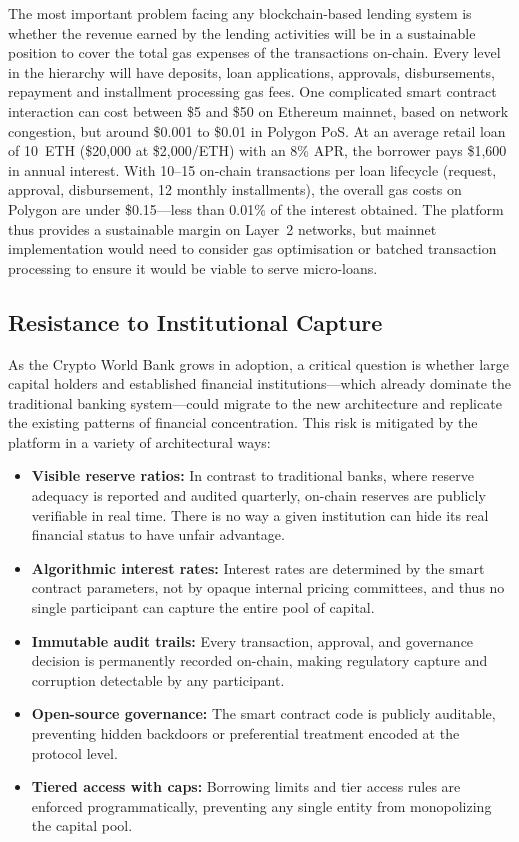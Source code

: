 \documentclass[12pt,a4paper]{report}
\begin{document}
The most important problem facing any blockchain-based lending system is whether the revenue earned by the lending activities will be in a sustainable position to cover the total gas expenses of the transactions on-chain. Every level in the hierarchy will have deposits, loan applications, approvals, disbursements, repayment and installment processing gas fees. One complicated smart contract interaction can cost between \$5 and \$50 on Ethereum mainnet, based on network congestion, but around \$0.001 to \$0.01 in Polygon PoS. At an average retail loan of 10~ETH (\$20,000 at \$2,000/ETH) with an 8\% APR, the borrower pays \$1,600 in annual interest. With 10--15 on-chain transactions per loan lifecycle (request, approval, disbursement, 12 monthly installments), the overall gas costs on Polygon are under \$0.15---less than 0.01\% of the interest obtained. The platform thus provides a sustainable margin on Layer~2 networks, but mainnet implementation would need to consider gas optimisation or batched transaction processing to ensure it would be viable to serve micro-loans.

\subsection{Resistance to Institutional Capture}

As the Crypto World Bank grows in adoption, a critical question is whether large capital holders and established financial institutions---which already dominate the traditional banking system---could migrate to the new architecture and replicate the existing patterns of financial concentration. This risk is mitigated by the platform in a variety of architectural ways:

\begin{itemize}[noitemsep]
\item \textbf{Visible reserve ratios:} In contrast to traditional banks, where reserve adequacy is reported and audited quarterly, on-chain reserves are publicly verifiable in real time. There is no way a given institution can hide its real financial status to have unfair advantage.
\item \textbf{Algorithmic interest rates:} Interest rates are determined by the smart contract parameters, not by opaque internal pricing committees, and thus no single participant can capture the entire pool of capital.
\item \textbf{Immutable audit trails:} Every transaction, approval, and governance decision is permanently recorded on-chain, making regulatory capture and corruption detectable by any participant.
\item \textbf{Open-source governance:} The smart contract code is publicly auditable, preventing hidden backdoors or preferential treatment encoded at the protocol level.
\item \textbf{Tiered access with caps:} Borrowing limits and tier access rules are enforced programmatically, preventing any single entity from monopolizing the capital pool.
\end{itemize}
\end{document}
